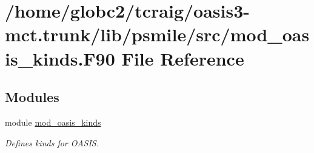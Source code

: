 \hypertarget{mod__oasis__kinds_8_f90}{}\section{/home/globc2/tcraig/oasis3-\/mct.trunk/lib/psmile/src/mod\+\_\+oasis\+\_\+kinds.F90 File Reference}
\label{mod__oasis__kinds_8_f90}
\subsection*{Modules}
\begin{DoxyCompactItemize}
\item 
module \hyperlink{namespacemod__oasis__kinds}{mod\+\_\+oasis\+\_\+kinds}
\begin{DoxyCompactList}\small\item\em Defines kinds for O\+A\+S\+IS. \end{DoxyCompactList}\end{DoxyCompactItemize}
